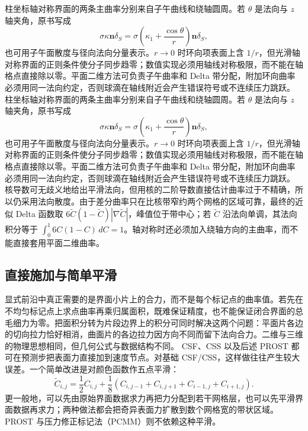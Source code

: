 \documentclass[11pt,a4paper,openany,fontset=none]{ctexbook}
\begin{document}
柱坐标轴对称界面的两条主曲率分别来自子午曲线和绕轴圆周。若 $\theta$ 是法向与 $z$ 轴夹角，原书写成
\begin{equation}
\sigma\kappa\boldsymbol n\delta_S
=\sigma\left(\kappa_1+\frac{\cos\theta}{r}\right)
\boldsymbol n\delta_S,
\tag{7.44}
\end{equation}
也可用子午面散度与径向法向分量表示。$r\to0$ 时环向项表面上含 $1/r$，但光滑轴对称界面的正则条件使分子同步趋零；数值实现必须用轴线对称极限，而不能在轴格点直接除以零。平面二维方法可负责子午曲率和 Delta 带分配，附加环向曲率必须用同一法向约定，否则球滴在轴线附近会产生错误符号或不连续压力跳跃。
柱坐标轴对称界面的两条主曲率分别来自子午曲线和绕轴圆周。若 $\theta$ 是法向与 $z$ 轴夹角，原书写成
\begin{equation}
\sigma\kappa\boldsymbol n\delta_S
=\sigma\left(\kappa_1+\frac{\cos\theta}{r}\right)
\boldsymbol n\delta_S,
\tag{7.44}
\end{equation}
也可用子午面散度与径向法向分量表示。$r\to0$ 时环向项表面上含 $1/r$，但光滑轴对称界面的正则条件使分子同步趋零；数值实现必须用轴线对称极限，而不能在轴格点直接除以零。平面二维方法可负责子午曲率和 Delta 带分配，附加环向曲率必须用同一法向约定，否则球滴在轴线附近会产生错误符号或不连续压力跳跃。
核导数可无歧义地给出平滑法向，但用核的二阶导数直接估计曲率过于不精确，所以仍采用法向散度。由于差分曲率只在比核带窄约两个网格的区域可靠，最终的近似 Delta 函数取 $6\widetilde C(1-\widetilde C)|\nabla\widetilde C|$，峰值位于带中心；若 $\widetilde C$ 沿法向单调，其法向积分等于 $\int_0^1 6C(1-C)\,dC=1$。轴对称时还必须加入绕轴方向的主曲率，而不能直接套用平面二维曲率。
\subsection{直接施加与简单平滑}

显式前沿中真正需要的是界面小片上的合力，而不是每个标记点的曲率值。若先在不均匀标记点上求点曲率再乘归属面积，既难保证精度，也不能保证闭合界面的总毛细力为零。把面积分转为片段边界上的积分可同时解决这两个问题：平面片各边的切向拉力恰好相消，曲面片的各边拉力因方向不同而留下法向合力。二维与三维的物理思想相同，但几何公式与数据结构不同。
CSF、CSS 以及后述 PROST 都可在预测步把表面力直接加到速度节点。对基础 CSF/CSS，这样做往往产生较大误差。一个简单改进是对颜色函数作五点平滑：
\begin{equation}
 \widetilde C_{i,j}=\frac12C_{i,j}
 +\frac18(C_{i,j-1}+C_{i,j+1}+C_{i-1,j}+C_{i+1,j}).
 \tag{7.34}
\end{equation}
更一般地，可以先由原始界面数据求力再把力分配到若干网格层，也可以先平滑界面数据再求力；两种做法都会把奇异表面力扩散到数个网格宽的带状区域。PROST 与压力修正标记法（PCMM）则不依赖这种平滑。
\end{document}
